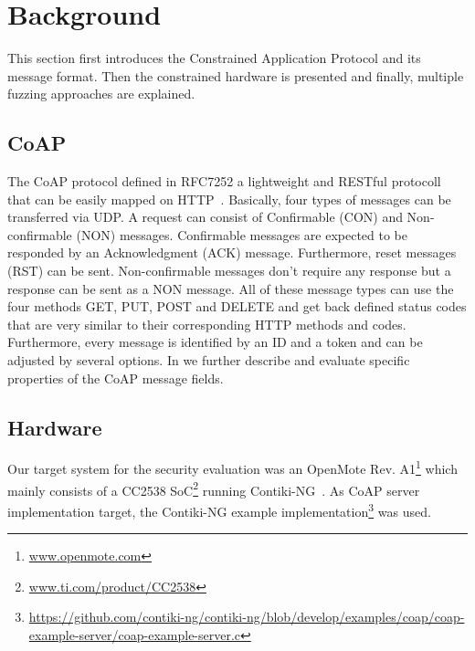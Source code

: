\section{Background}
\label{section:background}

This section first introduces the Constrained Application Protocol and its message format. Then the constrained hardware is presented and finally, multiple fuzzing approaches are explained.

\subsection{CoAP}

The CoAP protocol defined in RFC7252 a lightweight and RESTful protocoll that can be easily mapped on HTTP~\cite{RFC7252}. Basically, four types of messages can be transferred via UDP. A request can consist of Confirmable (CON) and Non-confirmable (NON) messages. Confirmable messages are expected to be responded by an Acknowledgment (ACK) message. Furthermore, reset messages (RST) can be sent. Non-confirmable messages don't require any response but a response can be sent as a NON message. All of these message types can use the four methods GET, PUT, POST and DELETE and get back defined status codes that are very similar to their corresponding HTTP methods and codes. Furthermore, every message is identified by an ID and a token and can be adjusted by several options. In  we further describe and evaluate specific properties of the CoAP message fields.

\subsection{Hardware}

Our target system for the security evaluation was an OpenMote Rev. A1\footnote{\url{www.openmote.com}} which mainly consists of a CC2538 SoC\footnote{\url{www.ti.com/product/CC2538}} running Contiki-NG~\cite{contiki}. As CoAP server implementation target, the Contiki-NG example implementation\footnote{\url{https://github.com/contiki-ng/contiki-ng/blob/develop/examples/coap/coap-example-server/coap-example-server.c}} was used.

